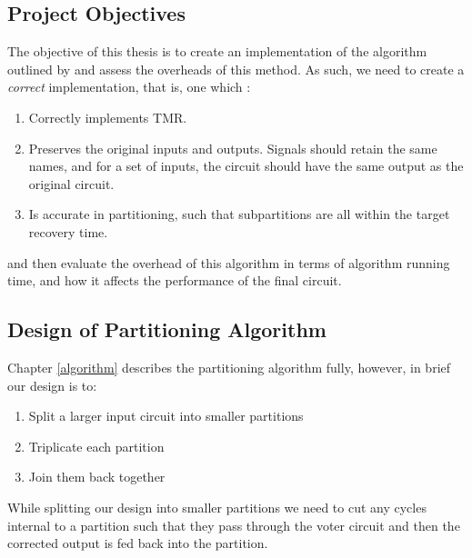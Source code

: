 \documentclass[12pt,final,oneside]{dwThesis} %
\begin{document}
   \subsection{Project Objectives}
   \label{secObjectives}
   The objective of this thesis is to create an implementation of the algorithm
   outlined by \cite{DiesselChange} and assess the overheads of this method.  As
   such, we need to create a \textit{correct} implementation, that is, one which
   :
   \begin{enumerate}

      \item Correctly implements TMR.
      \item Preserves the original inputs and outputs. Signals should retain
         the same names, and for a set of inputs, the circuit should have
         the same output as the original circuit.
      \item Is accurate in partitioning, such that subpartitions are all
         within the target recovery time.  
   \end{enumerate}
   and then
   evaluate the overhead of this algorithm in terms of algorithm running
   time, and how it affects the performance of the final circuit.

   \subsection{Design of Partitioning Algorithm} \label{DesignEstimates}
    Chapter \ref{algorithm} describes the partitioning algorithm fully, however, in brief our design is to:
    \begin{enumerate}
    	\item Split a larger input circuit into smaller partitions
    	\item Triplicate each partition
    	\item Join them back together
\end{enumerate}
    While splitting our design into smaller partitions we need to cut any cycles internal to a partition such that they pass through
    the voter circuit and then the corrected output is fed back into the partition.
    
\end{document}
